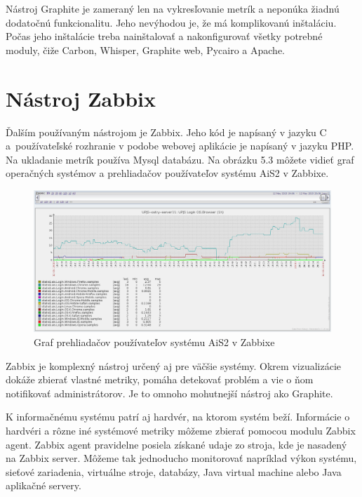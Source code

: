 \documentclass[a4paper, upjsfrontpage, disablespecwarning, thesismargins, thesislinespacing]{rnthesis}
\begin{document}
Nástroj Graphite je zameraný len na vykresľovanie metrík a neponúka žiadnú dodatočnú funkcionalitu.
Jeho nevýhodou je, že má komplikovanú inštaláciu.
Počas jeho inštalácie treba nainštalovať a nakonfigurovať všetky potrebné moduly, čiže Carbon, Whisper, Graphite web, Pycairo a Apache.


\section{Nástroj Zabbix}

Ďalším používaným nástrojom je Zabbix.
Jeho kód je napísaný v jazyku C a~používateľské rozhranie v podobe webovej aplikácie je napísaný v jazyku PHP.
Na ukladanie metrík používa Mysql databázu.
Na obrázku 5.3 môžete vidieť graf operačných systémov a prehliadačov používateľov systému AiS2 v Zabbixe.

\begin{figure}
	\begin{center}
		\includegraphics[scale=0.41]{zabbix1.png}
	\end{center}
	\caption{Graf prehliadačov používateľov systému AiS2 v Zabbixe}
\end{figure}

Zabbix je komplexný nástroj určený aj pre väčšie systémy.
Okrem vizualizácie dokáže zbierať vlastné metriky, pomáha detekovať problém a vie o ňom notifikovať administrátorov.
Je to omnoho mohutnejší nástroj ako Graphite.

K informačnému systému patrí aj hardvér, na ktorom systém beží.
Informácie o hardvéri a rôzne iné systémové metriky môžeme zbierať pomocou modulu Zabbix agent.
Zabbix agent pravidelne posiela získané udaje zo stroja, kde je nasadený na Zabbix server.
Môžeme tak jednoducho monitorovať napríklad výkon systému, sieťové zariadenia, virtuálne stroje, databázy, Java virtual machine alebo Java aplikačné servery.
\end{document}
